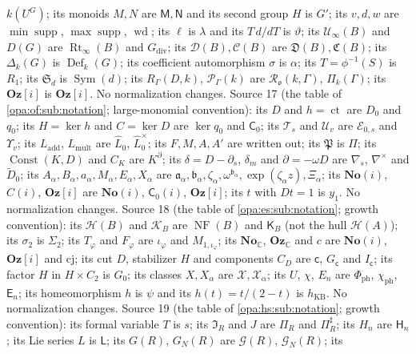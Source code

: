 \documentclass[11pt,oneside]{article}
\numberwithin{equation}{section}
\theoremstyle{definition}
\theoremstyle{remark}
\newcommand{\No}{\mathbf{No}}
\newcommand{\Oz}{\mathbf{Oz}}
\newcommand{\Og}{\mathbf{Oz}[i]}
\newcommand{\SC}{\mathbf{No}(i)}
\newcommand{\C}{\mathbb C}
\newcommand{\oo}{\mathfrak o}
\newcommand{\EE}{\mathcal E}
\newcommand{\HH}{\mathcal H}
\newcommand{\supp}{\operatorname{supp}}
\newcommand{\ct}{\operatorname{ct}}
\newcommand{\NF}{\operatorname{NF}}
\begin{document}
$k(U^G)$; its monoids $M,N$ are $\mathsf M,\mathsf N$ and its second group $H$ is $G'$; its $v,d,w$ are $\min\supp$,
$\max\supp$, $\operatorname{wd}$; its $\ell$ is $\lambda$ and its $T\,d/dT$ is $\vartheta$; its $\mathcal U_\infty(B)$ and
$D(G)$ are $\operatorname{Rt}_\infty(B)$ and $G_{\mathrm{div}}$; its $\mathcal D(B),\mathcal C(B)$ are
$\mathfrak D(B),\mathfrak C(B)$; its $\Delta_k(G)$ is $\operatorname{Def}_k(G)$; its coefficient automorphism $\sigma$ is
$\alpha$; its $T=\phi^{-1}(S)$ is $R_1$; its $\mathfrak S_d$ is $\operatorname{Sym}(d)$; its $R_\Gamma(D,k)$,
$\mathcal P_\Gamma(k)$ are $\mathcal R_\oo(k,\Gamma)$, $\Pi_k(\Gamma)$; its $\Oz[i]$ is $\Og$. No normalization changes.
Source 17 (the table of \cref{opa:of:sub:notation}; large-monomial convention): its $D$ and $h=\ct$ are $D_0$ and $q_0$; its $H=\ker h$ and
$C=\ker D$ are $\ker q_0$ and $\mathsf C_0$; its $\mathcal T_s$ and $\mathcal U_v$ are $\EE_{0,s}$ and $\Upsilon_v$; its $L_{\mathrm{add}}$,
$L_{\mathrm{mult}}$ are $\widehat L_0$, $\widehat L^\times_0$; its $F,M,A,A'$ are written out; its $\mathfrak P$ is $\Pi$; its $\operatorname{Const}(K,D)$
and $C_K$ are $K^\partial$; its $\delta=D-\partial_s$, $\delta_m$ and $\partial=-\omega D$ are $\nabla_{\!s}$, $\nabla^\times$ and $\widetilde D_0$; its
$A_\alpha,B_\alpha,a_\alpha,M_\alpha,E_\alpha,X_\alpha$ are $\mathfrak a_\alpha,\mathfrak b_\alpha,\zeta_\alpha,\omega^{\mathfrak b_\alpha},\exp(\zeta_\alpha z),\Xi_\alpha$; its $\No(i)$,
$C(i)$, $\Oz[i]$ are $\SC$, $\mathsf C_0(i)$, $\Og$; its $t$ with $Dt=1$ is $y_1$. No normalization changes.
Source 18 (the table of \cref{opa:es:sub:notation}; growth convention): its $\mathcal H(B)$ and $\mathcal K_B$ are $\NF(B)$ and $\mathsf K_B$ (not the
hull $\HH(A)$); its $\sigma_2$ is $\Sigma_2$; its $T_\varphi$ and $F_\varphi$ are $\iota_\varphi$ and $M_{1,\iota_\varphi}$; its $\mathbf{No}_\C$,
$\mathbf{Oz}_\C$ and $c$ are $\SC$, $\Og$ and $\mathrm{cj}$; its cut $D$, stabilizer $H$ and components $C_D$ are $\mathsf c$, $G_{\mathsf c}$ and
$I_{\mathsf c}$; its factor $H$ in $H\times C_2$ is $G_0$; its classes $X,X_\alpha$ are $\mathcal X,\mathcal X_\alpha$; its $U$, $\chi$, $E_n$ are
$\Phi_{\mathrm{ph}}$, $\chi_{\mathrm{ph}}$, $\mathsf E_n$; its homeomorphism $h$ is $\psi$ and its $h(t)=t/(2-t)$ is $h_{\mathrm{KB}}$. No normalization
changes.
Source 19 (the table of \cref{opa:hs:sub:notation}; growth convention): its formal variable $T$ is $s$; its $\mathfrak I_R$ and $J$ are $\Pi_R$ and
$\Pi^\sharp_R$; its $H_n$ are $\mathsf H_n$; its Lie series $L$ is $\mathsf L$; its $G(R)$, $G_N(R)$ are $\mathcal G(R)$, $\mathcal G_N(R)$; its
\end{document}
